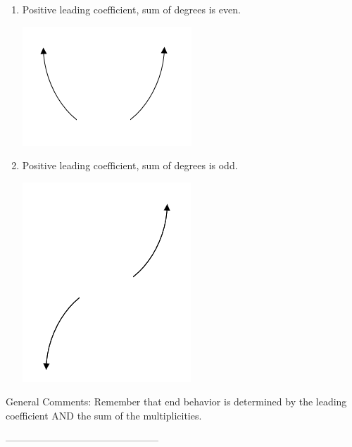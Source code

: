 \documentclass{article}[10pt]
\begin{document}
\begin{enumerate}[label=\Alph*.]
\item Positive leading coefficient, sum of degrees is even. 
\begin{center}\includegraphics[scale=0.5]{../Figures/endBehaviorPositiveEven.png}\end{center} 
 
\item Positive leading coefficient, sum of degrees is odd. 
\begin{center}\includegraphics[scale=0.5]{../Figures/endBehaviorPositiveOdd.png}\end{center} 
 
\end{enumerate} 
 
General Comments: Remember that end behavior is determined by the leading coefficient AND the sum of the multiplicities.

-----------------------------------------------
\end{document}
